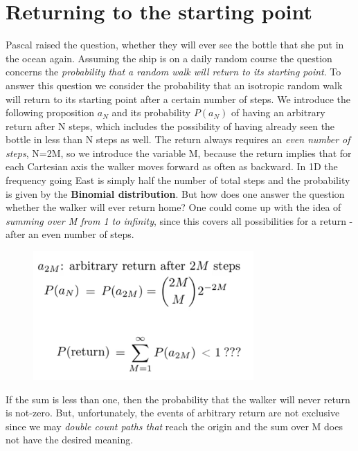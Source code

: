\documentclass[12pt, a4paper]{scrartcl}
\begin{document}
\section*{Returning to the starting point}
Pascal raised the question, whether they will ever see the bottle that she put in the ocean again.
Assuming the ship is on a daily random course the question concerns the\textit{ probability that a random walk will return to its starting point}. 
To answer this question we consider the probability that an isotropic random walk will return to its starting point after a certain number of steps.
We introduce the following proposition $a_N$ and its probability $P(a_N)$ of having an arbitrary return after N steps, which includes the possibility of having already seen the bottle in less than N steps as well.
The return always requires an \textit{even number of steps}, N=2M, so we introduce the variable M, because the return implies that for each Cartesian axis the walker moves forward as often as backward.
In 1D the frequency going East is simply half the number of total steps and the probability is given by the \textbf{Binomial distribution}.
But how does one answer the question whether the walker will ever return home? One could come up with the idea of \textit{summing over M from 1 to infinity}, since this covers all possibilities for a return - after an even number of steps. %
 \begin{figure}[H]
	\centering
	\includegraphics[width=0.75\textwidth]{5_5.png}
\end{figure}
If the sum is less than one, then the probability that the walker will never return is not-zero.
But, unfortunately, the events of arbitrary return are not exclusive since we may \textit{double count paths that} reach the origin and the sum over M does not have the desired meaning.\\
\end{document}
